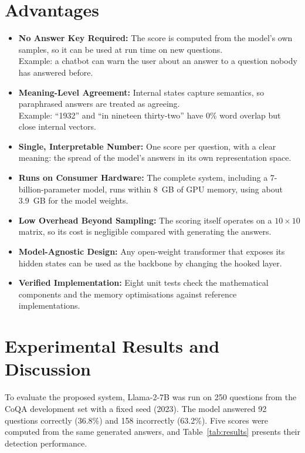 \documentclass[journal]{IEEEtran}
\begin{document}
\section{Advantages}
\begin{itemize}
\item \textbf{No Answer Key Required:} The score is computed from the model's own samples, so it can be used at run time on new questions.\\
Example: a chatbot can warn the user about an answer to a question nobody has answered before.
\item \textbf{Meaning-Level Agreement:} Internal states capture semantics, so paraphrased answers are treated as agreeing.\\
Example: ``1932'' and ``in nineteen thirty-two'' have 0\% word overlap but close internal vectors.
\item \textbf{Single, Interpretable Number:} One score per question, with a clear meaning: the spread of the model's answers in its own representation space.
\item \textbf{Runs on Consumer Hardware:} The complete system, including a 7-billion-parameter model, runs within 8~GB of GPU memory, using about 3.9~GB for the model weights.
\item \textbf{Low Overhead Beyond Sampling:} The scoring itself operates on a $10\times10$ matrix, so its cost is negligible compared with generating the answers.
\item \textbf{Model-Agnostic Design:} Any open-weight transformer that exposes its hidden states can be used as the backbone by changing the hooked layer.
\item \textbf{Verified Implementation:} Eight unit tests check the mathematical components and the memory optimisations against reference implementations.
\end{itemize}

\section{Experimental Results and Discussion}
To evaluate the proposed system, Llama-2-7B was run on 250 questions from the CoQA development set with a fixed seed (2023). The model answered 92 questions correctly (36.8\%) and 158 incorrectly (63.2\%). Five scores were computed from the same generated answers, and Table~\ref{tab:results} presents their detection performance.
\end{document}
